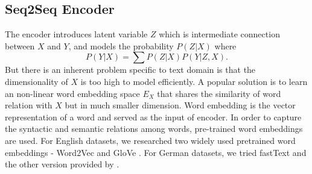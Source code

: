 \documentclass[11pt,a4paper]{article}
\begin{document}


\subsection{Seq2Seq Encoder}
The encoder introduces latent variable $Z$ which is intermediate connection between $X$ and $Y$, and models the probability $P(Z|X)$ where   
\begin{equation}
	P(Y|X) = \sum P(Z|X)P(Y|Z,X).
  \end{equation}
But there is an inherent problem specific to text domain is that the dimensionality of $X$ is too high to model efficiently. A popular solution is to learn an non-linear word embedding space $E_X$ that shares the similarity of word relation with $X$ but in much smaller dimension. Word embedding is the vector representation of a word and served as the input of encoder. In order to capture the syntactic and semantic relations among words, pre-trained word embeddings are used. For English datasets, we researched two widely used pretrained word embeddings - Word2Vec \cite{mikolov2013distributed} and GloVe \cite{pennington2014glove}. For German datasets, we tried fastText \cite{joulin2016fasttext} and the other version provided by \citep{goyal2017continuous}. 
\end{document}
